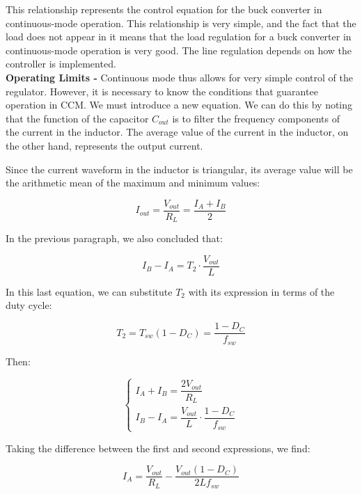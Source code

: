 \documentclass[../main.tex]{subfiles}
\begin{document}
This relationship represents the control equation for the buck converter in continuous-mode operation. 
This relationship is very simple, and the fact that the load does not appear in it means that the load regulation for a buck converter in continuous-mode operation is very good. The line regulation depends on how the controller is implemented.\\



\textbf{Operating Limits -} Continuous mode thus allows for very simple control of the regulator. However, it is necessary to know the conditions that guarantee operation in CCM. We must introduce a new equation. We can do this by noting that the function of the capacitor $C_{out}$ is to filter the frequency components of the current in the inductor. The average value of the current in the inductor, on the other hand, represents the output current.

Since the current waveform in the inductor is triangular, its average value will be the arithmetic mean of the maximum and minimum values:

\begin{equation}
	I_{out} = \frac{V_{out}}{R_L} = \frac{I_A + I_B}{2}
\end{equation}

In the previous paragraph, we also concluded that:

\begin{equation}
	I_B - I_A = T_2 \cdot \frac{V_{out}}{L}
\end{equation}

In this last equation, we can substitute $T_2$ with its expression in terms of the duty cycle:

\begin{equation}
	T_2 = T_{sw} (1 - D_C) = \frac{1 - D_C}{f_{sw}} 
\end{equation}

Then:

\begin{equation}
\begin{cases}
	I_A + I_B = \dfrac{2V_{out}}{R_L} \\
	I_B - I_A = \dfrac{V_{out}}{L} \cdot \dfrac{1 - D_C}{f_{sw}}
\end{cases}	
\end{equation}

Taking the difference between the first and second expressions, we find:

\begin{equation}
	I_A = \frac{V_{out}}{R_L} - \frac{V_{out}(1 - D_C)}{2Lf_{sw}}
\end{equation}
\end{document}
